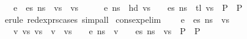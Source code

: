\begin{isabellebody}
\ {\isachardoublequoteopen}{\isasymLambda}{\isacharcomma}{\kern0pt}{\isasymGamma}{\isacharcomma}{\kern0pt}{\isasymDelta}\ {\isasymturnstile}\ {\isasymlangle}e\ {\isacharhash}{\kern0pt}\ es{\isacharcomma}{\kern0pt}\ n{\isacharunderscore}{\kern0pt}s{\isasymrangle}\ {\isacharbrackleft}{\kern0pt}{\isasymDown}{\isacharbrackright}{\kern0pt}\ vs\ {\isasymLongrightarrow}\ {\isacharparenleft}{\kern0pt}vs\ {\isasymnoteq}\ {\isacharbrackleft}{\kern0pt}{\isacharbrackright}{\kern0pt}\ {\isasymLongrightarrow}\ {\isasymLambda}{\isacharcomma}{\kern0pt}{\isasymGamma}{\isacharcomma}{\kern0pt}{\isasymDelta}\ {\isasymturnstile}\ {\isasymlangle}e{\isacharcomma}{\kern0pt}\ n{\isacharunderscore}{\kern0pt}s{\isasymrangle}\ {\isasymDown}\ hd\ vs\ {\isasymLongrightarrow}\ {\isasymLambda}{\isacharcomma}{\kern0pt}{\isasymGamma}{\isacharcomma}{\kern0pt}{\isasymDelta}\ {\isasymturnstile}\ {\isasymlangle}es{\isacharcomma}{\kern0pt}\ n{\isacharunderscore}{\kern0pt}s{\isasymrangle}\ {\isacharbrackleft}{\kern0pt}{\isasymDown}{\isacharbrackright}{\kern0pt}\ tl\ vs\ {\isasymLongrightarrow}\ P{\isacharparenright}{\kern0pt}\ {\isasymLongrightarrow}\ P{\isachardoublequoteclose}\isanewline
%
\isadelimproof
\ \ %
\endisadelimproof
%
\isatagproof
{}\isamarkupfalse%
\ {\isacharparenleft}{\kern0pt}erule\ red{\isacharunderscore}{\kern0pt}exprs{\isachardot}{\kern0pt}cases{\isacharsemicolon}{\kern0pt}\ simp{\isacharunderscore}{\kern0pt}all{\isacharparenright}{\kern0pt}%
\endisatagproof
{\isafoldproof}%
%
\isadelimproof
\isanewline
%
\endisadelimproof
\isanewline
{}\isamarkupfalse%
\ cons{\isacharunderscore}{\kern0pt}exp{\isacharunderscore}{\kern0pt}elim{}{\isacharcolon}{\kern0pt}\isanewline
\ \ {\isachardoublequoteopen}{\isasymlbrakk}{\isasymLambda}{\isacharcomma}{\kern0pt}{\isasymGamma}{\isacharcomma}{\kern0pt}{\isasymDelta}\ {\isasymturnstile}\ {\isasymlangle}e\ {\isacharhash}{\kern0pt}\ es{\isacharcomma}{\kern0pt}\ n{\isacharunderscore}{\kern0pt}s{\isasymrangle}\ {\isacharbrackleft}{\kern0pt}{\isasymDown}{\isacharbrackright}{\kern0pt}\ vs{\isacharsemicolon}{\kern0pt}\isanewline
\ \ \ {\isasymAnd}v\ vs{\isacharprime}{\kern0pt}{\isachardot}{\kern0pt}\ vs\ {\isacharequal}{\kern0pt}\ v\ {\isacharhash}{\kern0pt}\ vs{\isacharprime}{\kern0pt}\ {\isasymLongrightarrow}\ {\isasymLambda}{\isacharcomma}{\kern0pt}{\isasymGamma}{\isacharcomma}{\kern0pt}{\isasymDelta}\ {\isasymturnstile}\ {\isasymlangle}e{\isacharcomma}{\kern0pt}\ n{\isacharunderscore}{\kern0pt}s{\isasymrangle}\ {\isasymDown}\ v\ {\isasymLongrightarrow}\ {\isasymLambda}{\isacharcomma}{\kern0pt}{\isasymGamma}{\isacharcomma}{\kern0pt}{\isasymDelta}\ {\isasymturnstile}\ {\isasymlangle}es{\isacharcomma}{\kern0pt}\ n{\isacharunderscore}{\kern0pt}s{\isasymrangle}\ {\isacharbrackleft}{\kern0pt}{\isasymDown}{\isacharbrackright}{\kern0pt}\ vs{\isacharprime}{\kern0pt}\ {\isasymLongrightarrow}\ P{\isasymrbrakk}\ {\isasymLongrightarrow}\ P{\isachardoublequoteclose}\ \isanewline

\end{isabellebody}
